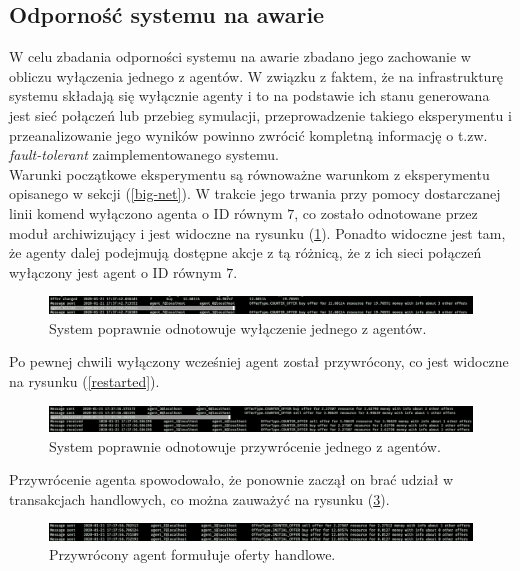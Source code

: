 \documentclass{article}
\begin{document}
\subsection{Odporność systemu na awarie}

W celu zbadania odporności systemu na awarie zbadano jego zachowanie w obliczu wyłączenia jednego z agentów. W związku z faktem, że na infrastrukturę systemu składają się wyłącznie agenty i to na podstawie ich stanu generowana 
jest sieć połączeń lub przebieg symulacji, przeprowadzenie takiego eksperymentu i przeanalizowanie jego wyników powinno zwrócić kompletną informację o t.zw. \textit{fault-tolerant} zaimplementowanego systemu. \\

Warunki początkowe eksperymentu są równoważne warunkom z eksperymentu opisanego w sekcji (\ref{big-net}). 
W trakcie jego trwania przy pomocy dostarczanej linii komend wyłączono agenta o ID równym $7$, co zostało odnotowane przez moduł archiwizujący i jest widoczne na rysunku (\ref{killed}). Ponadto widoczne jest tam, że agenty
dalej podejmują dostępne akcje z tą różnicą, że z ich sieci połączeń wyłączony jest agent o ID równym $7$.

\begin{figure}[H]
	\centering
	\includegraphics[width=\textwidth]{./png/killed.png}
	\caption{System poprawnie odnotowuje wyłączenie jednego z agentów.}
	\label{killed}
\end{figure}

Po pewnej chwili wyłączony wcześniej agent został przywrócony, co jest widoczne na rysunku (\ref{restarted}).

\begin{figure}[H]
	\centering
	\includegraphics[width=\textwidth]{./png/restared.png}
	\caption{System poprawnie odnotowuje przywrócenie jednego z agentów.}
	\label{restared}
\end{figure}

Przywrócenie agenta spowodowało, że ponownie zaczął on brać udział w transakcjach handlowych, co można zauważyć na rysunku (\ref{offers}). 

\begin{figure}[H]
	\centering
	\includegraphics[width=\textwidth]{./png/offers.png}
	\caption{Przywrócony agent formułuje oferty handlowe.}
	\label{offers}
\end{figure}
\end{document}
